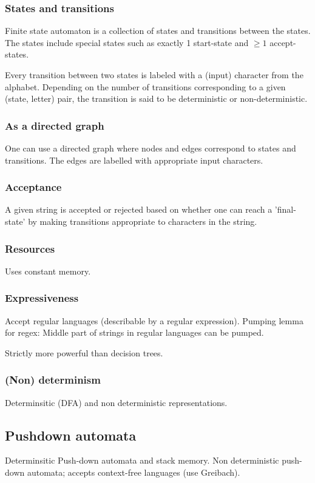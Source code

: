 \documentclass[oneside, article]{memoir}
\begin{document}
\subsubsection{States and transitions}
Finite state automaton is a collection of states and transitions between the states. The states include special states such as exactly 1 start-state and $\geq 1$ accept-states.

Every transition between two states is labeled with a (input) character from the alphabet. Depending on the number of transitions corresponding to a given (state, letter) pair, the transition is said to be deterministic or non-deterministic.

\subsubsection{As a directed graph}
One can use a directed graph where nodes and edges correspond to states and transitions. The edges are labelled with appropriate input characters.

\subsubsection{Acceptance}
A given string is accepted or rejected based on whether one can reach a 'final-state' by making transitions appropriate to characters in the string.

\subsubsection{Resources}
Uses constant memory.

\subsubsection{Expressiveness}
Accept regular languages (describable by a regular expression). Pumping lemma for regex: Middle part of strings in regular languages can be pumped.

Strictly more powerful than decision trees. \why

\subsubsection{(Non) determinism}
Determinsitic (DFA) and non deterministic representations.

\subsection{Pushdown automata}
Determinsitic Push-down automata and stack memory. Non deterministic push-down automata; accepts context-free languages (use Greibach).
\end{document}
